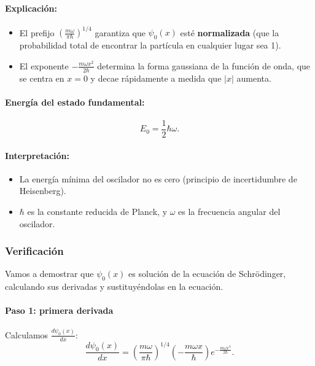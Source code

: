\documentclass[12pt, a4paper]{article}
\theoremstyle{rioplatense}
\begin{document}
\paragraph{Explicación:}
\begin{itemize}
    \item El prefijo \(\left( \frac{m\omega}{\pi\hbar} \right)^{1/4}\) garantiza que \(\psi_0(x)\) esté \textbf{normalizada} (que la probabilidad total de encontrar la partícula en cualquier lugar sea 1).
    \item El exponente \(-\frac{m\omega x^2}{2\hbar}\) determina la forma gaussiana de la función de onda, que se centra en \(x=0\) y decae rápidamente a medida que \(|x|\) aumenta.
\end{itemize}

\paragraph{Energía del estado fundamental:}
\begin{equation*}
    E_0 = \frac{1}{2}\hbar\omega.
\end{equation*}

\paragraph{Interpretación:}
\begin{itemize}
    \item La energía mínima del oscilador no es cero (principio de incertidumbre de Heisenberg).
    \item \(\hbar\) es la constante reducida de Planck, y \(\omega\) es la frecuencia angular del oscilador.
\end{itemize}

\subsubsection{Verificación} %

Vamos a demostrar que \(\psi_0(x)\) es solución de la ecuación de Schrödinger, calculando sus derivadas y sustituyéndolas en la ecuación.

\paragraph{Paso 1: primera derivada}
Calculamos \(\frac{d\psi_0(x)}{dx}\):
\begin{equation*}
    \frac{d\psi_0(x)}{dx} = \left( \frac{m\omega}{\pi\hbar} \right)^{1/4} \left( -\frac{m\omega x}{\hbar} \right) e^{-\frac{m\omega x^2}{2\hbar}}.
\end{equation*}
\end{document}
